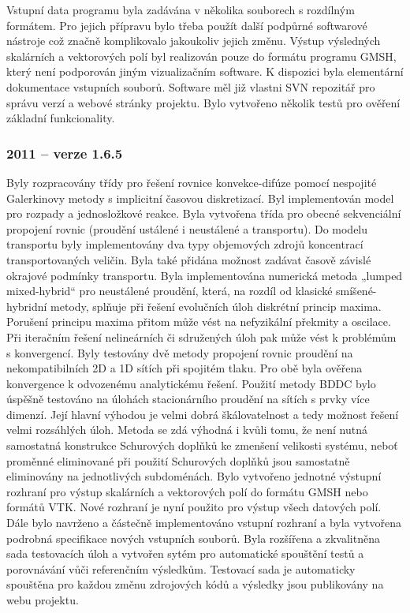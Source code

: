 \documentclass[11pt]{article}
\begin{document}
Vstupní data programu byla zadávána v několika 
souborech s rozdílným formátem. Pro jejich přípravu bylo třeba použít 
další podpůrné softwarové nástroje což značně komplikovalo jakoukoliv 
jejich změnu. Výstup výsledných skalárních a vektorových 
polí byl realizován pouze do formátu programu GMSH, který není podporován jiným 
vizualizačním software. K dispozici byla elementární dokumentace vstupních 
souborů. Software měl již vlastni SVN repozitář pro správu verzí a webové 
stránky projektu. Bylo vytvořeno několik testů pro ověření základní 
funkcionality. 


\subsubsection{2011 -- verze 1.6.5}
Byly rozpracovány třídy pro řešení rovnice konvekce-difúze pomocí nespojité 
Galerkinovy metody s implicitní časovou diskretizací. Byl implementován model 
pro rozpady a jednosložkové reakce. Byla vytvořena třída pro obecné sekvenciální 
propojení rovnic (proudění ustálené i neustálené a transportu). Do modelu 
transportu byly implementovány dva typy objemových zdrojů koncentrací 
transportovaných veličin. Byla také přidána možnost zadávat časově závislé 
okrajové podmínky transportu.
Byla implementována numerická metoda „lumped mixed-hybrid“ pro neustálené 
proudění, která, na rozdíl od klasické smíšené-hybridní metody, splňuje při 
řešení evolučních úloh diskrétní princip maxima. Porušení principu maxima přitom 
může vést na nefyzikální překmity a oscilace. Při iteračním řešení nelineárních 
či sdružených úloh pak může vést k problémům s konvergencí.
Byly testovány dvě metody propojení rovnic proudění na nekompatibilních 2D a 1D 
sítích při spojitém tlaku. Pro obě byla ověřena konvergence k odvozenému 
analytickému řešení.
Použití metody BDDC bylo úspěšně testováno na úlohách stacionárního proudění na 
sítích s prvky více dimenzí. Její hlavní výhodou je velmi dobrá škálovatelnost a 
tedy možnost řešení velmi rozsáhlých úloh. Metoda se zdá výhodná i kvůli tomu, 
že není nutná samostatná konstrukce Schurových doplňků ke zmenšení velikosti 
systému, neboť proměnné eliminované při použití Schurových doplňků jsou 
samostatně eliminovány na jednotlivých subdoménách.
Bylo vytvořeno jednotné výstupní rozhraní pro výstup skalárních a vektorových 
polí do formátu GMSH nebo formátů VTK. Nové rozhraní je nyní použito pro výstup 
všech datových polí. Dále bylo navrženo a částečně implementováno vstupní 
rozhraní a byla vytvořena podrobná specifikace nových vstupních souborů. 
Byla rozšířena a zkvalitněna sada testovacích úloh a vytvořen sytém pro 
automatické spouštění testů a porovnávání vůči referenčním výsledkům. Testovací 
sada je automaticky spouštěna pro každou změnu zdrojových kódů a výsledky jsou 
publikovány na webu projektu. 
\end{document}
